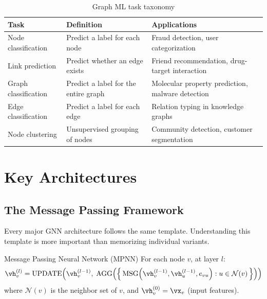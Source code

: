 \begin{table}[H]
\centering
\caption{Graph ML task taxonomy}
\begin{tabularx}{\textwidth}{lXX}
\toprule
\textbf{Task} & \textbf{Definition} & \textbf{Applications} \\
\midrule
Node classification & Predict a label for each node & Fraud detection, user categorization \\
Link prediction & Predict whether an edge exists & Friend recommendation, drug-target interaction \\
Graph classification & Predict a label for the entire graph & Molecular property prediction, malware detection \\
Edge classification & Predict a label for each edge & Relation typing in knowledge graphs \\
Node clustering & Unsupervised grouping of nodes & Community detection, customer segmentation \\
\bottomrule
\end{tabularx}
\end{table}

\section{Key Architectures}
\label{sec:gnn_architectures}

\subsection{The Message Passing Framework}

Every major GNN architecture follows the same template. Understanding this template is more important than memorizing individual variants.

\begin{mathresult}{Message Passing Neural Network (MPNN)}
For each node $v$, at layer $l$:
\begin{equation}
\vh_v^{(l)} = \text{UPDATE}\!\left(\vh_v^{(l-1)},\; \text{AGG}\!\left(\left\{\,\text{MSG}\!\left(\vh_v^{(l-1)}, \vh_u^{(l-1)}, e_{vu}\right) : u \in \mathcal{N}(v)\,\right\}\right)\right)
\label{eq:mpnn}
\end{equation}
where $\mathcal{N}(v)$ is the neighbor set of $v$, and $\vh_v^{(0)} = \vx_v$ (input features).
\end{mathresult}

